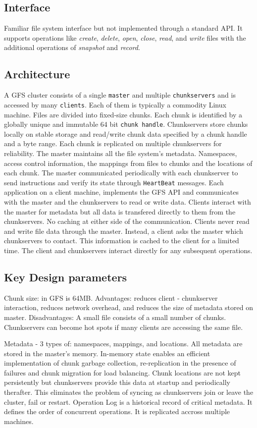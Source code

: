 \documentclass[letterpaper,twocolumn,10pt]{article}
\begin{document}
\subsection{Interface}
Familiar file system interface but not implemented through a standard API. It supports operations like \textit{create}, \textit{delete}, \textit{open}, \textit{close}, \textit{read}, and \textit{write} files with the additional operations of \textit{snapshot} and \textit{record}.
\subsection{Architecture}
A GFS cluster consists of a single {\tt master} and multiple {\tt chunkservers} and is accessed by many {\tt clients}. Each of them is typically a commodity Linux machine.
Files are divided into fixed-size {chunks}. Each chunk is identified by a globally unique and immutable 64 bit {\tt chunk handle}. Chunkservers store chunks locally on stable storage and read/write chunk data specified by a chunk handle and a byte range. Each chunk is replicated on multiple chunkservers for reliability.
The master maintains all the file system's metadata. Namespaces, access control information, the mappings from files to chunks and the locations of each chunk. The master communicated periodically with each chunkserver to send instructions and verify its state through {\tt HeartBeat} messages.
Each application on a client machine, implements the GFS API and communicates with the master and the chunkservers to read or write data.
Clients interact with the master for metadata but all data is transfered directly to them from the chunkservers. No caching at either side of the communication. 
Clients never read and write file data through the master. Instead, a client asks the master which chunkservers to contact. This information is cached to the client for a limited time. The client and chunkservers interact directly for any subsequent operations.

\subsection{Key Design parameters}
Chunk size: in GFS is 64MB.
Advantages: reduces client - chunkserver interaction, reduces network overhead, and reduces the size of metadata stored on master.
Disadvantages: A small file consists of a small number of chunks. Chunkservers can become hot spots if many clients are accessing the same file.

Metadata - 3 types of: namespaces, mappings, and locations. All metadata are stored in the master's memory.
In-memory state enables an efficient implementation of chunk garbage collection, re-replication in the presence of failures and chunk migration for load balancing.
Chunk locations are not kept persistently but chunkservers provide this data at startup and periodically therafter. This eliminates the problem of syncing as chunkservers join or leave the cluster, fail or restart.
Operation Log is a historical record of critical metadata. It defines the order of concurrent operations. It is replicated accross multiple machines.
\end{document}
